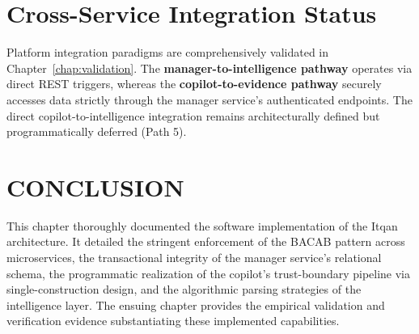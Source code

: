 \section{Cross-Service Integration Status}\label{sec:cross_service_status}
Platform integration paradigms are comprehensively validated in Chapter~\ref{chap:validation}. The \textbf{manager-to-intelligence pathway} operates via direct REST triggers, whereas the \textbf{copilot-to-evidence pathway} securely accesses data strictly through the manager service's authenticated endpoints. The direct copilot-to-intelligence integration remains architecturally defined but programmatically deferred (Path 5).

\section*{CONCLUSION}
This chapter thoroughly documented the software implementation of the Itqan architecture. It detailed the stringent enforcement of the BACAB pattern across microservices, the transactional integrity of the manager service's relational schema, the programmatic realization of the copilot's trust-boundary pipeline via single-construction design, and the algorithmic parsing strategies of the intelligence layer. The ensuing chapter provides the empirical validation and verification evidence substantiating these implemented capabilities.

